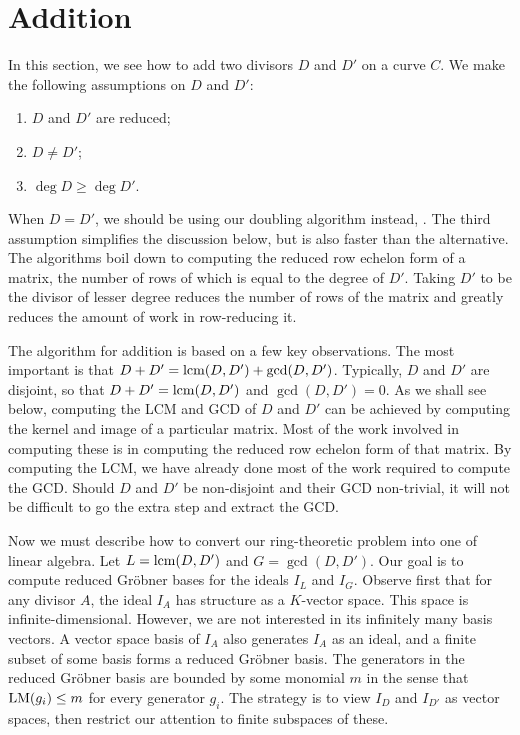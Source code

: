 
\section{Addition}
\label{chap_addition}

In this section, we see how to add two divisors $D$ and $D'$ on a curve $C$.
We make the following assumptions on $D$ and $D'$:
\begin{enumerate}[label=(\roman*)]
  \item $D$ and $D'$ are reduced;
  \item $D \neq D'$;
  \item $\deg D \geq \deg D'$.
\end{enumerate}
When $D = D'$, we should be using our doubling algorithm instead, .
The third assumption simplifies the discussion below, but is also faster than the alternative.
The algorithms boil down to computing the reduced row echelon form of a matrix, the number of rows of which is equal to the degree of $D'$.
Taking $D'$ to be the divisor of lesser degree reduces the number of rows of the matrix and greatly reduces the amount of work in row-reducing it.

The algorithm for addition is based on a few key observations.
The most important is that $D + D' = \operatorname{lcm}(D, D') + \gcd(D, D')$.
Typically, $D$ and $D'$ are disjoint, so that $D + D' = \operatorname{lcm}(D, D')$ and $\gcd(D, D') = 0$.
As we shall see below, computing the LCM and GCD of $D$ and $D'$ can be achieved by computing the kernel and image of a particular matrix.
Most of the work involved in computing these is in computing the reduced row echelon form of that matrix.
By computing the LCM, we have already done most of the work required to compute the GCD.
Should $D$ and $D'$ be non-disjoint and their GCD non-trivial, it will not be difficult to go the extra step and extract the GCD.

Now we must describe how to convert our ring-theoretic problem into one of linear algebra.
Let $L = \operatorname{lcm}(D, D')$ and $G = \gcd(D, D')$.
Our goal is to compute reduced Gr\"obner bases for the ideals $I_L$ and $I_G$.
Observe first that for any divisor $A$, the ideal $I_A$ has structure as a $K$-vector space.
This space is infinite-dimensional.
However, we are not interested in its infinitely many basis vectors.
A vector space basis of $I_A$ also generates $I_A$ as an ideal,
and a finite subset of some basis forms a reduced Gr\"obner basis.
The generators in the reduced Gr\"obner basis are bounded by some monomial $m$
in the sense that $\operatorname{LM}(g_i) \leq m$ for every generator $g_i$.
The strategy is to view $I_D$ and $I_{D'}$ as vector spaces,
then restrict our attention to finite subspaces of these.

